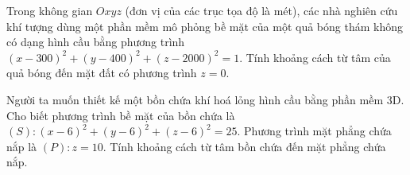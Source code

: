 \begin{ex}%
	Trong không gian $Oxyz$ (đơn vị của các trục tọa độ là mét), các nhà nghiên cứu khí tượng dùng một phần mềm mô phỏng bề mặt của một quả bóng thám không có dạng hình cầu bằng phương trình $(x-300)^2+(y-400)^2+(z-2000)^2=1$. Tính khoảng cách từ tâm của quả bóng đến mặt đất có phương trình $z=0$.
\end{ex}

\begin{ex}%
	Người ta muốn thiết kế một bồn chứa khí hoá lỏng hình cầu bằng phần mềm 3D. Cho biết phương trình bề mặt của bồn chứa là $(S)\colon (x-6)^2+(y-6)^2+(z-6)^2=25$. Phương trình mặt phẳng chứa nắp là $(P)\colon z=10$. Tính khoảng cách từ tâm bồn chứa đến mặt phẳng chứa nắp.
\end{ex}

